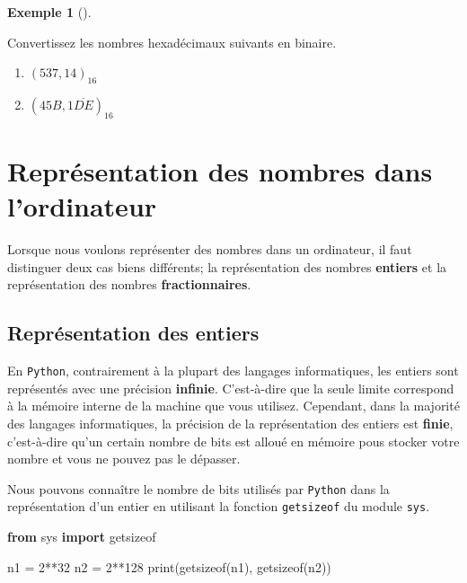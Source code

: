 \documentclass[
  letterpaper,
]{scrbook}
\newenvironment{Shaded}{\begin{snugshade}}{\end{snugshade}}
\newcommand{\BuiltInTok}[1]{\textcolor[rgb]{0.00,0.50,0.00}{#1}}
\newcommand{\DecValTok}[1]{\textcolor[rgb]{0.25,0.63,0.44}{#1}}
\newcommand{\ImportTok}[1]{\textcolor[rgb]{0.00,0.50,0.00}{\textbf{#1}}}
\newcommand{\NormalTok}[1]{\textcolor[rgb]{0.00,0.44,0.13}{#1}}
\newcommand{\OperatorTok}[1]{\textcolor[rgb]{0.40,0.40,0.40}{#1}}
\providecommand{\tightlist}{%
  \setlength{\itemsep}{0pt}\setlength{\parskip}{0pt}}\usepackage{longtable,booktabs,array}
\theoremstyle{plain}
\theoremstyle{definition}
\theoremstyle{definition}
\newtheorem{example}{Exemple}[chapter]
\theoremstyle{remark}
\begin{document}
\begin{example}[]\protect\hypertarget{exm-conversion-hexadecimal-binaire}{}\label{exm-conversion-hexadecimal-binaire}

Convertissez les nombres hexadécimaux suivants en binaire.

\begin{enumerate}
\def\labelenumi{\alph{enumi})}
\tightlist
\item
  \((537,14)_{16}\)
\item
  \((45B,1\overline{DE})_{16}\)
\end{enumerate}

\end{example}


\hypertarget{repruxe9sentation-des-nombres-dans-lordinateur}{%
\chapter{Représentation des nombres dans
l'ordinateur}\label{repruxe9sentation-des-nombres-dans-lordinateur}}

Lorsque nous voulons représenter des nombres dans un ordinateur, il faut
distinguer deux cas biens différents; la représentation des nombres
\textbf{entiers} et la représentation des nombres
\textbf{fractionnaires}.

\hypertarget{repruxe9sentation-des-entiers}{%
\section{Représentation des
entiers}\label{repruxe9sentation-des-entiers}}

En \texttt{Python}, contrairement à la plupart des langages
informatiques, les entiers sont représentés avec une précision
\textbf{infinie}. C'est-à-dire que la seule limite correspond à la
mémoire interne de la machine que vous utilisez. Cependant, dans la
majorité des langages informatiques, la précision de la représentation
des entiers est \textbf{finie}, c'est-à-dire qu'un certain nombre de
bits est alloué en mémoire pous stocker votre nombre et vous ne pouvez
pas le dépasser.

Nous pouvons connaître le nombre de bits utilisés par \texttt{Python}
dans la représentation d'un entier en utilisant la fonction
\texttt{getsizeof} du module \texttt{sys}.

\begin{Shaded}
\begin{Highlighting}[]
\ImportTok{from}\NormalTok{ sys }\ImportTok{import}\NormalTok{ getsizeof}

\NormalTok{n1 }\OperatorTok{=} \DecValTok{2}\OperatorTok{**}\DecValTok{32}
\NormalTok{n2 }\OperatorTok{=} \DecValTok{2}\OperatorTok{**}\DecValTok{128}
\BuiltInTok{print}\NormalTok{(getsizeof(n1), getsizeof(n2))}
\end{Highlighting}
\end{Shaded}
\end{document}
